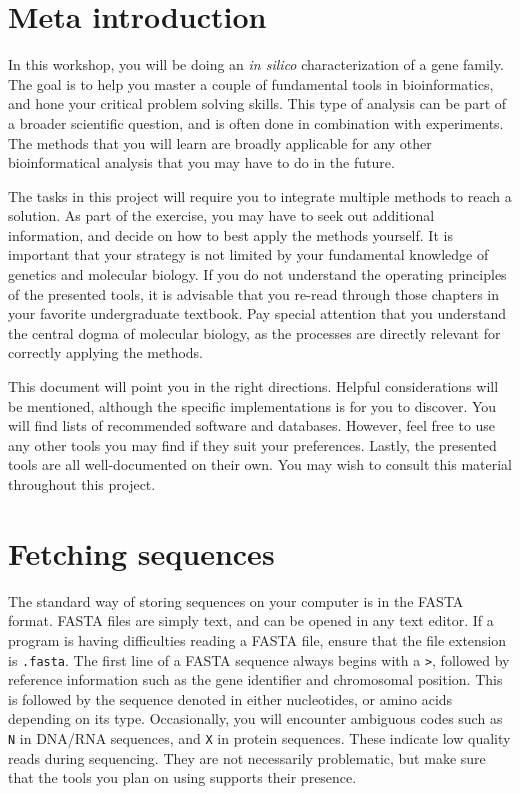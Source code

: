 \documentclass[11pt]{article}
\begin{document}
 	\section*{Meta introduction}
 	In this workshop, you will be doing an \textit{in silico} characterization of a gene family. The goal is to help you master a couple of fundamental tools in bioinformatics, and hone your critical problem solving skills. This type of analysis can be part of a broader scientific question, and is often done in combination with experiments. The methods that you will learn are broadly applicable for any other bioinformatical analysis that you may have to do in the future.
 	
    The tasks in this project will require you to integrate multiple methods to reach a solution. As part of the exercise, you may have to seek out additional information, and decide on how to best apply the methods yourself. It is important that your strategy is not limited by your fundamental knowledge of genetics and molecular biology. If you do not understand the operating principles of the presented tools, it is advisable that you re-read through those chapters in your favorite undergraduate textbook. Pay special attention that you understand the central dogma of molecular biology, as the processes are directly relevant for correctly applying the methods.
    
    This document will point you in the right directions. Helpful considerations will be mentioned, although the specific implementations is for you to discover. You will find lists of recommended software and databases. However, feel free to use any other tools you may find if they suit your preferences. Lastly, the presented tools are all well-documented on their own. You may wish to consult this material throughout this project.
    
    \section*{Fetching sequences}
    The standard way of storing sequences on your computer is in the FASTA format. FASTA files are simply text, and can be opened in any text editor. If a program is having difficulties reading a FASTA file, ensure that the file extension is \texttt{.fasta}.
    The first line of a FASTA sequence always begins with a \texttt{>}, followed by reference information such as the gene identifier and chromosomal position. This is followed by the sequence denoted in either nucleotides, or amino acids depending on its type. Occasionally, you will encounter ambiguous codes such as \texttt{N} in DNA/RNA sequences, and \texttt{X} in protein sequences. These indicate low quality reads during sequencing. They are not necessarily problematic, but make sure that the tools you plan on using supports their presence.
    
\end{document}
